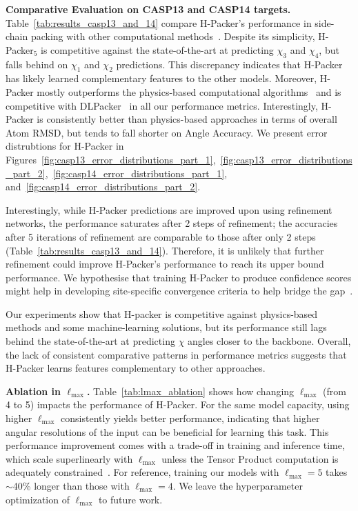 \textbf{Comparative Evaluation on CASP13 and CASP14 targets.}
Table~\ref{tab:results_casp13_and_14} compare H-Packer's performance in side-chain packing with
other computational methods~\citep{mcpartlon_end--end_2023, zhang_diffpack_2023,
misiura_dlpacker_2022, krivov_improved_2009, alford_rosetta_2017, huang_faspr_2020}. Despite its
simplicity, H-Packer$_5$ is competitive against the state-of-the-art at predicting $\chi_3$ and
$\chi_4$, but falls behind on $\chi_1$ and $\chi_2$ predictions. This discrepancy indicates that
H-Packer has likely learned complementary features to the other models. Moreover, H-Packer mostly
outperforms the physics-based computational algorithms~\citep{krivov_improved_2009,
alford_rosetta_2017, huang_faspr_2020} and is competitive with
DLPacker~\citep{misiura_dlpacker_2022} in all our performance metrics. Interestingly, H-Packer is
consistently better than physics-based approaches in terms of overall Atom RMSD, but tends to fall
shorter on Angle Accuracy. We present error distrubtions for H-Packer in
Figures~\ref{fig:casp13_error_distributions_part_1},~\ref{fig:casp13_error_distributions_part_2},~\ref{fig:casp14_error_distributions_part_1},
and~\ref{fig:casp14_error_distributions_part_2}.
 
Interestingly, while H-Packer predictions are improved upon using refinement networks, the
performance saturates after 2 steps of refinement; the accuracies after 5 iterations of refinement
are comparable to those after only 2 steps (Table~\ref{tab:results_casp13_and_14}). Therefore, it
is unlikely that further refinement could improve H-Packer's performance to reach its upper bound
performance. We hypothesise that training H-Packer to produce confidence scores might help in
developing site-specific convergence criteria to help bridge the
gap~\citep{mcpartlon_end--end_2023, zhang_diffpack_2023}.

Our experiments show that H-packer is competitive against physics-based methods and some
machine-learning solutions, but its performance still lags behind the state-of-the-art at
predicting $\chi$ angles closer to the backbone. Overall, the lack of consistent comparative
patterns in performance metrics suggests that H-Packer learns features complementary to other
approaches.

\textbf{Ablation in $\ell_{\text{max}}$.} Table~\ref{tab:lmax_ablation} shows how changing
$\ell_{\text{max}}$ (from 4 to 5) impacts  the performance of H-Packer. For the same model
capacity, using higher $\ell_{\text{max}}$ consistently yields better performance, indicating that
higher angular resolutions of the input can be beneficial for learning this task. This performance
improvement comes with a trade-off in  training and inference time, which scale superlinearly with
$\ell_{\text{max}}$ unless the Tensor Product computation is adequately
constrained~\citep{cobb_efficient_2021}. For reference, training  our models with
$\ell_{\text{max}} = 5$ takes $\sim$40\% longer than those with $\ell_{\text{max}} = 4$. We leave
the hyperparameter optimization of   $\ell_{\text{max}}$ to future work. 


